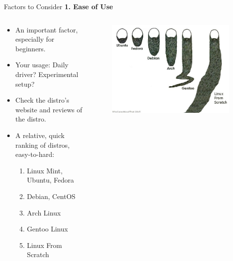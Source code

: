 \documentclass[11pt]{beamer}
\begin{document}
\begin{frame}[t]{Factors to Consider}
	\textbf{\LARGE 1. Ease of Use}
	\begin{columns}
		\begin{column}{0.5\textwidth}
			\begin{itemize}
				\item An important factor, especially for beginners.
				\item Your usage: Daily driver? Experimental setup?
				\item Check the distro's website and reviews of the distro.
				\item A relative, quick ranking of distros, easy-to-hard:
				\begin{enumerate}
					\item Linux Mint, Ubuntu, Fedora
					\item Debian, CentOS
					\item Arch Linux
					\item Gentoo Linux
					\item Linux From Scratch
				\end{enumerate}
			\end{itemize}
		\end{column}
		\begin{column}{0.5\textwidth}
			\begin{figure}
				\includegraphics[scale=0.25]{neckbeard-chart.png}
			\end{figure}
		\end{column}
	\end{columns}
\end{frame}
\end{document}
